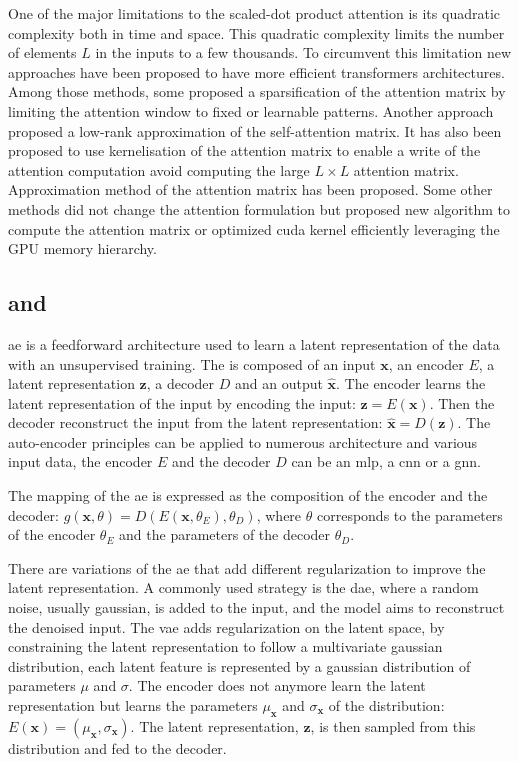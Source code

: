 \documentclass[../main.tex]{subfiles}
\begin{document}
     One of the major limitations to the scaled-dot product attention is its quadratic complexity both in time and space.
     This quadratic complexity limits the number of elements \(L\) in the inputs to a few thousands.
     To circumvent this limitation new approaches have been proposed to have more efficient transformers architectures.
     Among those methods, some proposed a sparsification of the attention matrix by limiting the attention window to fixed or learnable patterns.
     Another approach proposed a low-rank approximation of the self-attention matrix.
     It has also been proposed to use kernelisation of the attention matrix to enable a write of the attention computation avoid computing the large \(L \times L\) attention matrix.
     Approximation method of the attention matrix has been proposed.
     Some other methods did not change the attention formulation but proposed new algorithm to compute the attention matrix or optimized cuda kernel efficiently leveraging the GPU memory hierarchy.

 \subsection{ and }
     \Gls{ae} is a feedforward architecture used to learn a latent representation of the data with an unsupervised training.
     The  is composed of an input \(\symbf{x}\), an encoder \(E\), a latent representation \(\symbf{z}\), a decoder \(D\) and an output \(\symbf{\hat{x}}\).
     The encoder learns the latent representation of the input by encoding the input: \(\symbf{z} = E\left(\symbf{x}\right)\).
     Then the decoder reconstruct the input from the latent representation: \(\symbf{\hat{x}} = D\left(\symbf{z}\right)\).
     The auto-encoder principles can be applied to numerous architecture and various input data, the encoder \(E\) and the decoder \(D\) can be an \gls{mlp}, a \gls{cnn} or a \gls{gnn}.

     The mapping of the \gls{ae} is expressed as the composition of the encoder and the decoder: \(g\left(\symbf{x}, \theta\right) = D\left(E\left(\symbf{x}, \theta_E\right), \theta_D\right)\), where \(\theta\) corresponds to the parameters of the encoder \(\theta_E\) and the parameters of the decoder \(\theta_D\).

     There are variations of the \gls{ae} that add different regularization to improve the latent representation.
     A commonly used strategy is the \gls{dae}, where a random noise, usually gaussian, is added to the input, and the model aims to reconstruct the denoised input.
     The \gls{vae} adds regularization on the latent space, by constraining the latent representation to follow a multivariate gaussian distribution, each latent feature is represented by a gaussian distribution of parameters \(\mu\) and \(\sigma\).
     The encoder does not anymore learn the latent representation but learns the parameters \(\mu_{\symbf{x}}\) and \(\sigma_{\symbf{x}}\) of the distribution: \(E\left(\symbf{x}\right) = \left(\mu_{\symbf{x}},\sigma_{\symbf{x}}\right) \).
     The latent representation, \(\symbf{z}\), is then sampled from this distribution and fed to the decoder.
\end{document}

